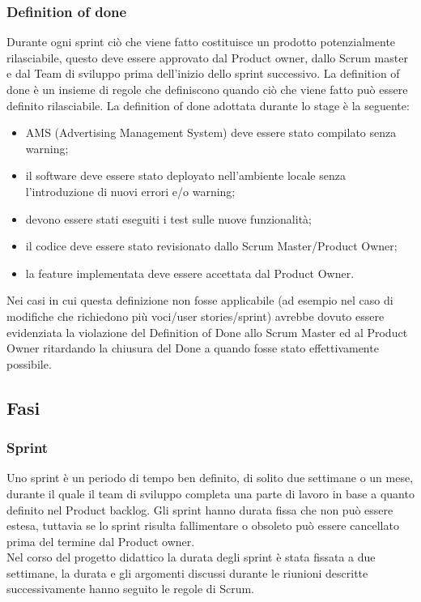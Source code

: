 \subsubsection{Definition of done}
Durante ogni sprint ciò che viene fatto costituisce un prodotto potenzialmente rilasciabile, questo deve essere approvato dal Product owner, dallo Scrum master e dal Team di sviluppo prima dell'inizio dello sprint successivo. La definition of done è un insieme di regole che definiscono quando ciò che viene fatto può essere definito rilasciabile.
La definition of done adottata durante lo stage è la seguente:
\begin{itemize}
    \item AMS (Advertising Management System) deve essere stato compilato senza warning;
    \item il software deve essere stato deployato nell’ambiente locale senza l'introduzione di nuovi errori e/o warning;
    \item devono essere stati eseguiti i test sulle nuove funzionalità;
    \item il codice deve essere stato revisionato dallo Scrum Master/Product Owner;
    \item la feature implementata deve essere accettata dal Product Owner.
\end{itemize}
Nei casi in cui questa definizione non fosse applicabile (ad esempio nel caso di modifiche che richiedono più voci/user stories/sprint) avrebbe dovuto essere evidenziata la violazione del Definition of Done allo Scrum Master ed al Product Owner ritardando la chiusura del Done a quando fosse stato effettivamente possibile.



\subsection{Fasi}

\subsubsection{Sprint}
Uno sprint è un periodo di tempo ben definito, di solito due settimane o un mese, durante il quale il team di sviluppo completa una parte di lavoro in base a quanto definito nel Product backlog.
Gli sprint hanno durata fissa che non può essere estesa, tuttavia se lo sprint risulta fallimentare o obsoleto può essere cancellato prima del termine dal Product owner.
\\Nel corso del progetto didattico la durata degli sprint è stata fissata a due settimane, la durata e gli argomenti discussi durante le riunioni descritte successivamente hanno seguito le regole di Scrum.

